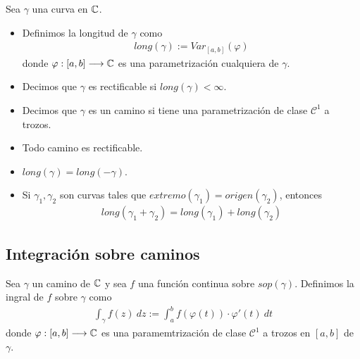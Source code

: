 \begin{defi}
    Sea $\gamma$ una curva en $\mathbb{C}$.
    \begin{itemize}
        \item  Definimos la longitud de $\gamma$ como
              \begin{align*}
                  long(\gamma) := Var_{[a,b]}(\varphi)
              \end{align*}
              donde $\varphi : [a,b] \longrightarrow \mathbb{C}$ es una parametrización cualquiera de $\gamma$.
        \item Decimos que $\gamma$ es rectificable si $long(\gamma) < \infty$.
        \item Decimos que $\gamma$ es un camino si tiene una parametrización de clase $\mathcal{C}^1$ a trozos.
    \end{itemize}
\end{defi}

\begin{obs}
    \begin{itemize}
        \item Todo camino es rectificable.
        \item $long(\gamma) = long(-\gamma)$.
        \item Si $\gamma_1,\gamma_2$ son curvas tales que $extremo(\gamma_1) = origen(\gamma_2)$, entonces
              \begin{align*}
                  long(\gamma_1 + \gamma_2) = long(\gamma_1) + long(\gamma_2)
              \end{align*}
    \end{itemize}
\end{obs}

\subsection{Integración sobre caminos}

\begin{defi}
    Sea $\gamma$ un camino de $\mathbb{C}$ y sea $f$ una función continua sobre $sop(\gamma)$. Definimos la ingral de $f$ sobre $\gamma$ como
    \begin{align*}
        \int_{\gamma}{f(z) \ dz} := \int_{a}^{b}{f(\varphi(t))\cdot \varphi'(t) \ dt}
    \end{align*}
    donde $\varphi : [a,b] \longrightarrow \mathbb{C}$ es una paramemtrización de clase $\mathcal{C}^1$ a trozos en $[a,b]$ de $\gamma$.
\end{defi}

